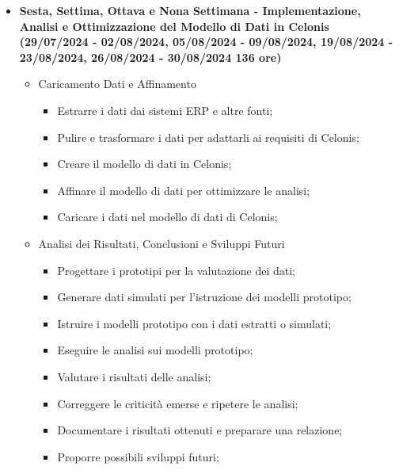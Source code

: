 {\begin{itemize}
        \item \textbf{Sesta, Settima, Ottava e Nona Settimana - Implementazione, Analisi e Ottimizzazione del Modello di Dati in Celonis (29/07/2024 - 02/08/2024, 05/08/2024 - 09/08/2024, 19/08/2024 - 23/08/2024, 26/08/2024 - 30/08/2024  136 ore)} 
        \begin{itemize}
	 \item Caricamento Dati e Affinamento
	 \begin{itemize}
		\item Estrarre i dati dai sistemi ERP e altre fonti;
		\item Pulire e trasformare i dati per adattarli ai requisiti di Celonis;
		\item Creare il modello di dati in Celonis;
		\item Affinare il modello di dati per ottimizzare le analisi;
		\item Caricare i dati nel modello di dati di Celonis;
	 \end{itemize}
	\newpage
	 \item Analisi dei Risultati, Conclusioni e Sviluppi Futuri
	 \begin{itemize}
		\item Progettare i prototipi per la valutazione dei dati;
	 	\item Generare dati simulati per l'istruzione dei modelli prototipo;
	 	\item Istruire i modelli prototipo con i dati estratti o simulati;
	 	\item Eseguire le analisi sui modelli prototipo;
	 	\item Valutare i risultati delle analisi;
	 	\item Correggere le criticità emerse e ripetere le analisi;
	 	\item Documentare i risultati ottenuti e preparare una relazione;
	 	\item Proporre possibili sviluppi futuri;
	 \end{itemize}
        \end{itemize}
    \end{itemize}
}

\newcommand{\totaleOre}{306}

